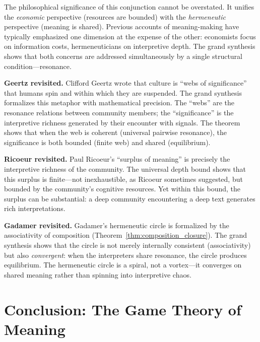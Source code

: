 The philosophical significance of this conjunction cannot be overstated.
It unifies the \emph{economic} perspective (resources are bounded) with the
\emph{hermeneutic} perspective (meaning is shared).  Previous accounts of
meaning-making have typically emphasized one dimension at the expense of the
other: economists focus on information costs, hermeneuticians on
interpretive depth.  The grand synthesis shows that both concerns are
addressed simultaneously by a single structural condition---resonance.

\medskip

\noindent\textbf{Geertz revisited.}
Clifford Geertz wrote that culture is ``webs of significance'' that humans
spin and within which they are suspended.  The grand synthesis formalizes
this metaphor with mathematical precision.  The ``webs'' are the resonance
relations between community members; the ``significance'' is the
interpretive richness generated by their encounter with signals.  The
theorem shows that when the web is coherent (universal pairwise resonance),
the significance is both bounded (finite web) and shared (equilibrium).

\medskip

\noindent\textbf{Ricoeur revisited.}
Paul Ricoeur's ``surplus of meaning'' is precisely the interpretive richness
of the community.  The universal depth bound shows that this surplus is
finite---not inexhaustible, as Ricoeur sometimes suggested, but bounded by
the community's cognitive resources.  Yet within this bound, the surplus can
be substantial: a deep community encountering a deep text generates rich
interpretations.

\medskip

\noindent\textbf{Gadamer revisited.}
Gadamer's hermeneutic circle is formalized by the associativity of
composition (Theorem~\ref{thm:composition_closure}).  The grand synthesis
shows that the circle is not merely internally consistent (associativity)
but also \emph{convergent}: when the interpreters share resonance, the
circle produces equilibrium.  The hermeneutic circle is a spiral, not a
vortex---it converges on shared meaning rather than spinning into
interpretive chaos.

\section{Conclusion: The Game Theory of Meaning}
\label{sec:ch20-concl}


